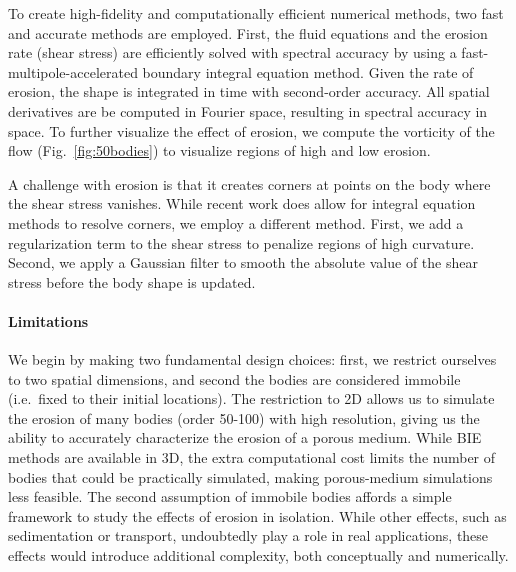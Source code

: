 \documentclass[preprint, 10pt]{elsarticle}
\begin{document}
To create high-fidelity and computationally efficient numerical methods,
two fast and accurate methods are employed.  First, the fluid equations
and the erosion rate (shear stress) are efficiently solved with spectral
accuracy by using a fast-multipole-accelerated boundary integral
equation method.  Given the rate of erosion, the shape is integrated in
time with second-order accuracy.  All spatial derivatives are be
computed in Fourier space, resulting in spectral accuracy in space.
To further visualize the effect of erosion, we compute the
vorticity of the flow (Fig.~\ref{fig:50bodies}) to visualize regions
of high and low erosion.

A challenge with erosion is that it creates corners at points on the
body where the shear stress vanishes.  While recent work does allow for
integral equation methods to resolve corners, we employ a different
method.  
First, we add a regularization term to the shear stress to
penalize regions of high curvature.  Second, we apply a Gaussian filter
to smooth the absolute value of the shear stress before the body shape
is updated.

\paragraph{Limitations} 

We begin by making two fundamental design choices: first, we restrict ourselves to two spatial dimensions, and second the bodies are considered immobile (i.e.~fixed to their initial locations). The restriction to 2D allows us to simulate the erosion of many bodies (order 50-100) with high resolution, giving us the ability to accurately characterize the erosion of a porous medium. While BIE methods are available in 3D, the extra computational cost limits the number of bodies that could be practically simulated, making porous-medium simulations less feasible. The second assumption of immobile bodies affords a simple framework to study the effects of erosion in isolation. While other effects, such as sedimentation or transport, undoubtedly play a role in real applications, these effects would introduce additional complexity, both conceptually and numerically. 
\end{document}
